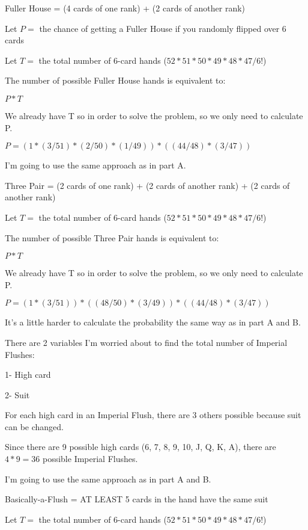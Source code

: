 \documentclass{6042}
\author{Ian Miller}
\begin{document}


Fuller House = (4 cards of one rank) + (2 cards of another rank)

Let $P =$ the chance of getting a Fuller House if you randomly flipped over 6 cards

Let $T =$ the total number of 6-card hands ($52*51*50*49*48*47/6!$)

The number of possible Fuller House hands is equivalent to:

$P * T$

We already have T so in order to solve the problem, so we only need to calculate P.

$P = (1 * (3/51) * (2/50) * (1/49)) * ((44/48) * (3/47))$




I'm going to use the same approach as in part A.

Three Pair = (2 cards of one rank) + (2 cards of another rank) + (2 cards of another rank)

Let $T =$ the total number of 6-card hands ($52*51*50*49*48*47/6!$)

The number of possible Three Pair hands is equivalent to:

$P * T$

We already have T so in order to solve the problem, so we only need to calculate P.

$P = (1 * (3/51)) * ((48/50) * (3/49)) * ((44/48) * (3/47))$


It's a little harder to calculate the probability the same way as in part A and B.

There are 2 variables I'm worried about to find the total number of Imperial Flushes:

1- High card

2- Suit 

For each high card in an Imperial Flush, there are 3 others possible because suit can be changed.

Since there are 9 possible high cards (6, 7, 8, 9, 10, J, Q, K, A), there are $4 * 9 = 36$ possible Imperial Flushes.


I'm going to use the same approach as in part A and B.

Basically-a-Flush = AT LEAST 5 cards in the hand have the same suit

Let $T =$ the total number of 6-card hands ($52*51*50*49*48*47/6!$)
\end{document}
